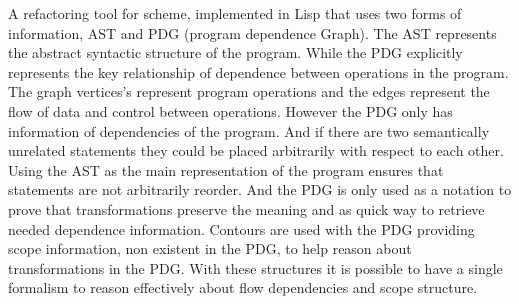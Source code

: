 A refactoring tool \cite{griswold1991program} for scheme, implemented in Lisp that
uses two forms of information, AST and PDG (program dependence Graph).
The AST represents the abstract syntactic structure of the program.
While the PDG explicitly represents the key relationship of dependence between
operations in the program. %
The graph vertices's represent program operations and the edges represent the flow of
data and control between operations.
However the PDG only has information of dependencies of the program. And if there
are two semantically unrelated statements they could be placed arbitrarily with
respect to each other.
Using the AST as the main representation of the program ensures that statements
are not arbitrarily reorder.
And the PDG is only used as a notation to prove that transformations preserve
the meaning and as quick way to retrieve needed dependence information.
Contours are used with the PDG providing scope information, non existent in the PDG,
to help reason about transformations in the PDG.
With these structures it is possible to have a single formalism to reason effectively
about flow dependencies and scope structure.





